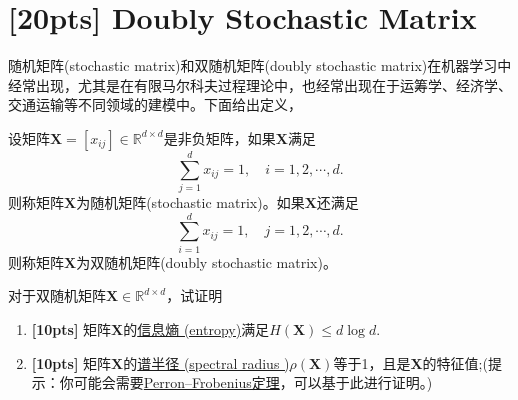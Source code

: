 \documentclass[a4paper,UTF8]{article}
\numberwithin{equation}{section}
\begin{document}
\section{[20pts] Doubly Stochastic Matrix}
随机矩阵(stochastic matrix)和双随机矩阵(doubly stochastic matrix)在机器学习中经常出现，尤其是在有限马尔科夫过程理论中，也经常出现在于运筹学、经济学、交通运输等不同领域的建模中。下面给出定义，
\begin{def-box}[随机矩阵]
设矩阵$\mathbf{X}=[x_{ij}]\in \mathbb{R}^{d\times d}$是非负矩阵，如果$\mathbf{X}$满足
\begin{equation}
	\label{eq-sto-matrix}
	\sum_{j=1}^d x_{ij} = 1,\quad i=1,2,\cdots,d.
\end{equation}
则称矩阵$\mathbf{X}$为随机矩阵(stochastic matrix)。如果$\mathbf{X}$还满足
\begin{equation}
	\label{eq-double-sto-matrix}
	\sum_{i=1}^d x_{ij} = 1,\quad j=1,2,\cdots,d.
\end{equation}
则称矩阵$\mathbf{X}$为双随机矩阵(doubly stochastic matrix)。
\end{def-box}
对于双随机矩阵$\mathbf{X} \in \mathbb{R}^{d\times d}$，试证明
\begin{enumerate}[ {(}1{)}]
\item \textbf{[10pts]} 矩阵$\mathbf{X}$的\href{https://en.wikipedia.org/wiki/Entropy_(information_theory)}{信息熵 (entropy)}满足$H(\mathbf{X}) \leq d\log d$.
\item \textbf{[10pts]} 矩阵$\mathbf{X}$的\href{https://en.wikipedia.org/wiki/Spectral_radius}{谱半径 (spectral radius
)}$\rho(\mathbf{X})$等于1，且是$\mathbf{X}$的特征值;(提示：你可能会需要\href{https://en.wikipedia.org/wiki/Perron%E2%80%93Frobenius_theorem}{Perron–Frobenius定理}，可以基于此进行证明。)
\end{enumerate}
\end{document}
